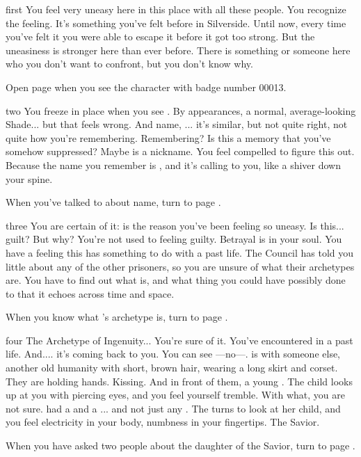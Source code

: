 \documentclass[greennotebook]{Silversiders} %
\begin{document}
\startnotebook{\nTraitorGreen{}}

\begin{page}{first}
You feel very uneasy here in this place with all these people. You recognize the feeling. It's something you've felt before in Silverside. Until now, every time you've felt it you were able to escape it before it got too strong. But the uneasiness is stronger here than ever before. There is something or someone here who you don't want to confront, but you don't know why.

Open page  when you see the character with badge number 00013.
\end{page}

\begin{page}{two}
You freeze in place when you see \cIngenuity{\them}. By appearances, a normal, average-looking Shade... but that feels wrong. And \cIngenuity{\their} name, \cIngenuity{}... it's similar, but not quite right, not quite how you're remembering. Remembering? Is this a memory that you've somehow suppressed? Maybe \cIngenuity{} is a nickname. You feel compelled to figure this out. Because the name you remember is \cIngenuityOld{}, and it's calling to you, like a shiver down your spine.

When you've talked to \cIngenuity{} about \cIngenuity{\their} name, turn to page .
\end{page}

\begin{page}{three}
You are certain of it: \cIngenuity{\intro} is the reason you've been feeling so uneasy. Is this... guilt? But why? You're not used to feeling guilty. Betrayal is in your soul. You have a feeling this has something to do with a past life. The Council has told you little about any of the other prisoners, so you are unsure of what their archetypes are. You have to find out what \cIngenuity{} is, and what thing you could have possibly done to \cIngenuity{\them} that it echoes across time and space.

When you know what \cIngenuity{}'s archetype is, turn to page .
\end{page}

\begin{page}{four}
The Archetype of Ingenuity... You're sure of it. You've encountered \cIngenuity{\them} in a past life. And.... it's coming back to you. You can see \cIngenuity{\intro}—no—\cIngenuityOld{\intro}. \cIngenuityOld{\They} is with someone else, another old humanity \cSavior{\human} with short, brown hair, wearing a long skirt and corset. They are holding hands. Kissing. And in front of them, a young \cLoyalty{\kid}. The child looks up at you with piercing eyes, and you feel yourself tremble. With what, you are not sure. \cIngenuityOld{} had a \cSavior{\spouse} and a \cLoyalty{\offspring}... and not just any \cSavior{\spouse}. The \cSavior{\human} turns to look at her child, and you feel electricity in your body, numbness in your fingertips. The Savior.

When you have asked two people about the daughter of the Savior, turn to page .
\end{page}
\end{document}
